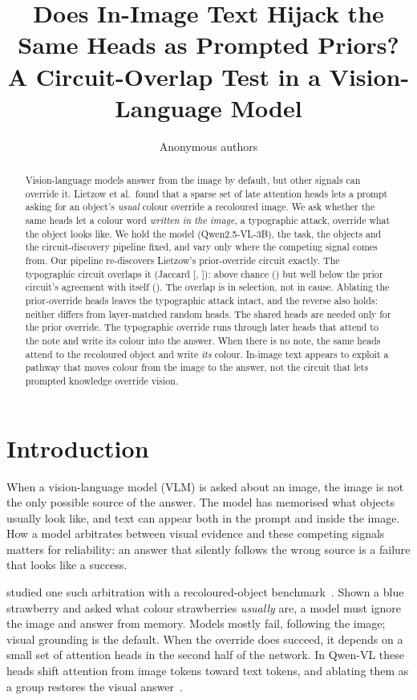 \documentclass[10pt,twocolumn,letterpaper]{article}
\title{Does In-Image Text Hijack the Same Heads as Prompted Priors?\\
\large A Circuit-Overlap Test in a Vision-Language Model}
\author{Anonymous authors\todo{author block per the venue's anonymity rules}}
\date{}
\begin{document}
\maketitle

\begin{abstract}
Vision-language models answer from the image by default, but other signals can
override it. Lietzow et al.\ found that a sparse set of late attention heads lets
a prompt asking for an object's \emph{usual} colour override a recoloured image.
We ask whether the same heads let a colour word \emph{written in the image}, a
typographic attack, override what the object looks like. We hold the model
(Qwen2.5-VL-3B), the task, the objects and the circuit-discovery pipeline fixed,
and vary only where the competing signal comes from. Our pipeline re-discovers
Lietzow's prior-override circuit exactly. The typographic circuit overlaps it
(Jaccard \JPT{} [\JPTLo, \JPTHi]): above chance (\chanceEdge) but well below the
prior circuit's agreement with itself (\ceilingMedian). The overlap is in
selection, not in cause. Ablating the prior-override heads leaves the
typographic attack intact, and the reverse also holds: neither differs from
layer-matched random heads. The shared heads are needed only for the prior
override. The typographic override runs through \nTonly{} later heads that
attend to the note and write its colour into the answer. When there is no note,
the same heads attend to the recoloured object and write \emph{its} colour.
In-image text appears to exploit a pathway that moves colour from the image to
the answer, not the circuit that lets prompted knowledge override vision.
\end{abstract}

\section{Introduction}

When a vision-language model (VLM) is asked about an image, the image is not the
only possible source of the answer. The model has memorised what objects usually
look like, and text can appear both in the prompt and inside the image. How a
model arbitrates between visual evidence and these competing signals matters for
reliability: an answer that silently follows the wrong source is a failure that
looks like a success.

\citet{lietzow2026} studied one such arbitration with a recoloured-object
benchmark~\cite{golovanevsky2025counterfact}. Shown a blue strawberry and asked
what colour strawberries \emph{usually} are, a model must ignore the image and
answer from memory. Models mostly fail, following the image; visual grounding is
the default. When the override does succeed, it depends on a small set of
attention heads in the second half of the network. In Qwen-VL these heads shift
attention from image tokens toward text tokens, and ablating them as a group
restores the visual answer~\cite{lietzow2026}.
\end{document}
